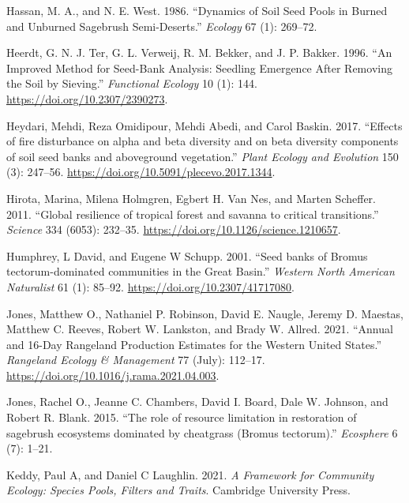 \documentclass[
  12pt,
]{article}
\newlength{\cslhangindent}
\newlength{\cslentryspacingunit} %
\newenvironment{CSLReferences}[2] %
 {%
  \setlength{\parindent}{0pt}
  \ifodd #1
  \let\oldpar\par
  \def\par{\hangindent=\cslhangindent\oldpar}
  \fi
  \setlength{\parskip}{#2\cslentryspacingunit}
 }%
 {}
\begin{document}
\begin{CSLReferences}{1}{0}
\leavevmode{}%
Hassan, M. A., and N. E. West. 1986. {``{Dynamics of Soil Seed Pools in
Burned and Unburned Sagebrush Semi-Deserts}.''} \emph{Ecology} 67 (1):
269--72.

\leavevmode{}%
Heerdt, G. N. J. Ter, G. L. Verweij, R. M. Bekker, and J. P. Bakker.
1996. {``{An Improved Method for Seed-Bank Analysis: Seedling Emergence
After Removing the Soil by Sieving}.''} \emph{Functional Ecology} 10
(1): 144. \url{https://doi.org/10.2307/2390273}.

\leavevmode{}%
Heydari, Mehdi, Reza Omidipour, Mehdi Abedi, and Carol Baskin. 2017.
{``{Effects of fire disturbance on alpha and beta diversity and on beta
diversity components of soil seed banks and aboveground vegetation}.''}
\emph{Plant Ecology and Evolution} 150 (3): 247--56.
\url{https://doi.org/10.5091/plecevo.2017.1344}.

\leavevmode{}%
Hirota, Marina, Milena Holmgren, Egbert H. Van Nes, and Marten Scheffer.
2011. {``{Global resilience of tropical forest and savanna to critical
transitions}.''} \emph{Science} 334 (6053): 232--35.
\url{https://doi.org/10.1126/science.1210657}.

\leavevmode{}%
Humphrey, L David, and Eugene W Schupp. 2001. {``{Seed banks of Bromus
tectorum-dominated communities in the Great Basin}.''} \emph{Western
North American Naturalist} 61 (1): 85--92.
\url{https://doi.org/10.2307/41717080}.

\leavevmode{}%
Jones, Matthew O., Nathaniel P. Robinson, David E. Naugle, Jeremy D.
Maestas, Matthew C. Reeves, Robert W. Lankston, and Brady W. Allred.
2021. {``Annual and 16-{Day} {Rangeland} {Production} {Estimates} for
the {Western} {United} {States}.''} \emph{Rangeland Ecology \&
Management} 77 (July): 112--17.
\url{https://doi.org/10.1016/j.rama.2021.04.003}.

\leavevmode{}%
Jones, Rachel O., Jeanne C. Chambers, David I. Board, Dale W. Johnson,
and Robert R. Blank. 2015. {``{The role of resource limitation in
restoration of sagebrush ecosystems dominated by cheatgrass (Bromus
tectorum)}.''} \emph{Ecosphere} 6 (7): 1--21.

\leavevmode{}%
Keddy, Paul A, and Daniel C Laughlin. 2021. \emph{A Framework for
Community Ecology: Species Pools, Filters and Traits}. Cambridge
University Press.


\end{CSLReferences}
\end{document}
